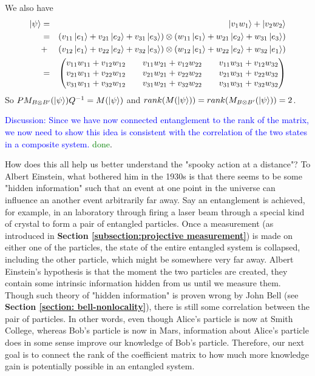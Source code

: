 \begin{example}

We also have
\begin{eqnarray*}
\ket{\psi}&=&\ket{v_1 w_1}+\ket{v_2 w_2}\\
&=& (v_{11}\ket{e_1}+v_{21}\ket{e_2}+v_{31}\ket{e_3}) \otimes (w_{11}\ket{e_1}+w_{21}\ket{e_2}+w_{31}\ket{e_3}) \\
&+& (v_{12}\ket{e_1}+v_{22}\ket{e_2}+v_{32}\ket{e_3}) \otimes (w_{12}\ket{e_1}+w_{22}\ket{e_2}+w_{32}\ket{e_1})\\
&=&\begin{pmatrix}
v_{11}w_{11}+v_{12}w_{12} && v_{11}w_{21}+v_{12}w_{22} && v_{11}w_{31}+v_{12}w_{32}\\
v_{21}w_{11}+v_{22}w_{12} && v_{21}w_{21}+v_{22}w_{22} && v_{21}w_{31}+v_{22}w_{32} \\
v_{31}w_{11}+v_{32}w_{12} && v_{31}w_{21}+v_{32}w_{22} && v_{31}w_{31}+v_{32}w_{32} 
\end{pmatrix}
\end{eqnarray*}
So $PM_{B \otimes B'}(\ket{\psi})Q^{-1}=M(\ket{\psi})$ and $rank(M(\ket{\psi}))=rank(M_{B \otimes B'}(\ket{\psi}))=2$.
\end{example}


\textcolor{blue}{Discussion: Since we have now connected entanglement to the rank of the matrix, we now need to show this idea is consistent with the correlation of the two states in a composite system.} \textcolor{green}{done}.

How does this all help us better understand the "spooky action at a distance"? To Albert Einstein, what bothered him in the 1930s is that there seems to be some "hidden information" such that an event at one point in the universe can influence an another event arbitrarily far away. Say an entanglement is achieved, for example, in an laboratory through firing a laser beam through a special kind of crystal to form a pair of entangled particles. Once a measurement (as introduced in \textbf{Section \ref{subsection:projective measurement}}) is made on either one of the particles, the state of the entire entangled system is collapsed, including the other particle, which might be somewhere very far away. Albert Einstein's hypothesis is that the moment the two particles are created, they contain some intrinsic information hidden from us until we measure them. Though such theory of "hidden information" is proven wrong by John Bell (see \textbf{Section \ref{section: bell-nonlocality}}), there is still some correlation between the pair of particles. In other words, even though Alice's particle is now at Smith College, whereas Bob's particle is now in Mars, information about Alice's particle does in some sense improve our knowledge of Bob's particle. Therefore, our next goal is to connect the rank of the coefficient matrix to how much more knowledge gain is potentially possible in an entangled system.

